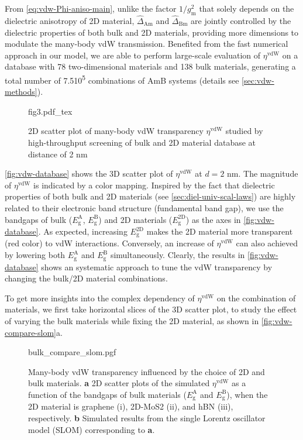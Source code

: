 From \autoref{eq:vdw-Phi-aniso-main}, unlike the factor
\(1/g_{\mathrm{m}}^{2}\) that solely depends on the dielectric
anisotropy of 2D material, \(\hat{\Delta}_{\mathrm{Am}}\) and
\(\hat{\Delta}_{\mathrm{Bm}}\) are jointly controlled by the
dielectric properties of both bulk and 2D materials, providing more
dimensions to modulate the many-body vdW transmission.
%
Benefited from
the fast numerical approach in our model, we are able to perform
large-scale evaluation of $\eta^{\mathrm{vdW}}$ on a database with
78 two-dimensional materials and 138 bulk materials, generating a total number of
7.5\texttimes{}10\textsuperscript{5} combinations of AmB systems
(details see \autoref{sec:vdw-methods}).
%
\begin{figure}[!htbp]
  \centering{}
  {fig3.pdf_tex}
  \caption{\label{fig:vdw-database} %
    2D scatter plot of many-body vdW transparency
    $\eta^{\mathrm{vdW}}$ studied by high-throughput screening of bulk
    and 2D material database at distance of 2 nm}
\end{figure}

\autoref{fig:vdw-database} shows the 3D scatter plot of
\(\eta^{\mathrm{vdW}}\) at \(d=2\) nm. The magnitude of
$\eta^{\mathrm{vdW}}$ is indicated by a color mapping.
%
Inspired by the fact that dielectric properties of both bulk
\cite{Moss_1950} and 2D materials (see
\autoref{sec:diel-univ-scal-laws}) are highly related to their
electronic band structure (\ie fundamental band gap), we use the
bandgaps of bulk (\(E_{\mathrm{g}}^{\mathrm{A}}\),
\(E_{\mathrm{g}}^{\mathrm{B}}\)) and 2D materials
(\(E_{\mathrm{g}}^{\mathrm{2D}}\)) as the axes in
\autoref{fig:vdw-database}.
%
As expected, increasing \(E_{\mathrm{g}}^{\mathrm{2D}}\) makes the 2D
material more transparent (red color) to vdW interactions.
%
Conversely, an increase of \(\eta^{\mathrm{vdW}}\) can also achieved
by lowering both \(E_{\mathrm{g}}^{\mathrm{A}}\) and
\(E_{\mathrm{g}}^{\mathrm{B}}\) simultaneously.
%
Clearly, the results in \autoref{fig:vdw-database} shows an systematic
approach to tune the vdW transparency by changing the bulk/2D material
combinations.


To get more insights into the complex dependency of
\(\eta^{\mathrm{vdW}}\) on the combination of materials, we first take
horizontal slices of the 3D scatter plot, to study the effect of
varying the bulk materials while fixing the 2D material, as shown in
\autoref{fig:vdw-compare-slom}a.
%
\begin{figure}[h!]
  \centering{}
  {bulk_compare_slom.pgf}
  \caption{\label{fig:vdw-compare-slom}%
    Many-body vdW transparency influenced by the choice of 2D and bulk
    materials. \textbf{a} 2D scatter plots of the simulated
    $\eta^{\mathrm{vdW}}$ as a function of the bandgaps of bulk
    materials ($E_{\mathrm{g}}^{\mathrm{A}}$ and
    $E_{\mathrm{g}}^{\mathrm{B}}$), when the 2D material is graphene
    (i), 2D-MoS2 (ii), and hBN (iii), respectively.  \textbf{b}
    Simulated results from the single Lorentz oscillator model (SLOM)
    corresponding to \textbf{a}.}
\end{figure}
%

